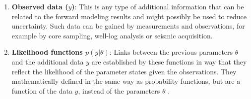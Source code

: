 \begin{enumerate}
        	\item \textbf{Observed data ($y$)}: This is any type of additional information that can be related to the forward modeling results and might possibly be used to reduce uncertainty. Such data can be gained by measurements and observations, for example by core sampling, well-log analysis or seismic acquisition. 
        	\item \textbf{Likelihood functions $p(y|\theta)$}: Links between the previous parameters $\theta$ and the additional data $y$ are established by these functions in way that they reflect the likelihood of the parameter states given the observations. They mathematically defined in the same way as probability functions, but are a function of the data $y$, instead of the parameters $\theta$ \citep{delaVarga2016}.
        \end{enumerate}
        

